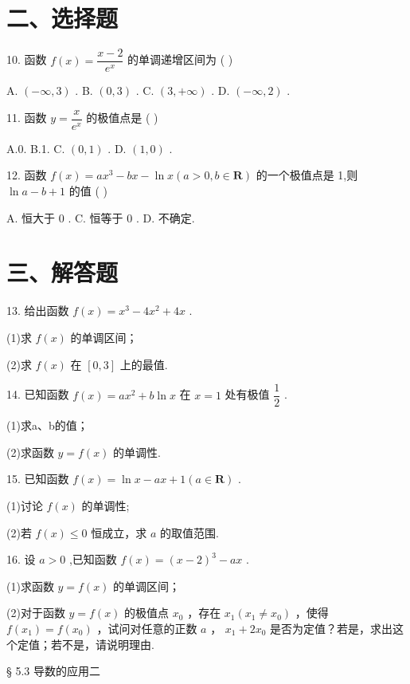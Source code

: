 \section*{二、选择题}

10. 函数 $f\left( x\right)  = \dfrac{x - 2}{{{e}}^{x}}$ 的单调递增区间为 ( )

A. $\left( {-\infty ,3}\right)$ . B. $\left( {0,3}\right)$ . C. $\left( {3, + \infty }\right)$ . D. $\left( {-\infty ,2}\right)$ .

11. 函数 $y = \dfrac{x}{{{e}}^{x}}$ 的极值点是 ( )

A.0. B.1. C. $\left( {0,1}\right)$ . D. $\left( {1,0}\right)$ .

12. 函数 $f\left( x\right)  = a{x}^{3} - {bx} - \ln x\left( {a > 0,b \in  \mathbf{R}}\right)$ 的一个极值点是 1,则 $\ln a - b + 1$ 的值 ( )

A. 恒大于 0 . C. 恒等于 0 . D. 不确定.

\section*{三、解答题}

13. 给出函数 $f\left( x\right)  = {x}^{3} - 4{x}^{2} + {4x}$ .

(1)求 $f\left( x\right)$ 的单调区间；

(2)求 $f\left( x\right)$ 在 $\left\lbrack  {0,3}\right\rbrack$ 上的最值.

14. 已知函数 $f\left( x\right)  = a{x}^{2} + b\ln x$ 在 $x = 1$ 处有极值 $\dfrac{1}{2}$ .

(1)求a、b的值；

(2)求函数 $y = f\left( x\right)$ 的单调性.

15. 已知函数 $f\left( x\right)  = \ln x - {ax} + 1\left( {a \in  \mathbf{R}}\right)$ .

(1)讨论 $f\left( x\right)$ 的单调性;

(2)若 $f\left( x\right)  \leq  0$ 恒成立，求 $a$ 的取值范围.

16. 设 $a > 0$ ,已知函数 $f\left( x\right)  = {\left( x - 2\right) }^{3} - {ax}$ .

(1)求函数 $y = f\left( x\right)$ 的单调区间；

(2)对于函数 $y = f\left( x\right)$ 的极值点 ${x}_{0}$ ，存在 ${x}_{1}\left( {{x}_{1} \neq  {x}_{0}}\right)$ ，使得 $f\left( {x}_{1}\right)  = f\left( {x}_{0}\right)$ ，试问对任意的正数 $a$ ， ${x}_{1} + 2{x}_{0}$ 是否为定值？若是，求出这个定值；若不是，请说明理由.

§ 5.3 导数的应用二

